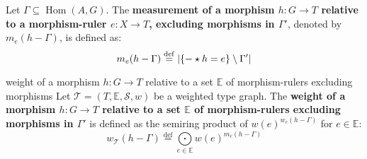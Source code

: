 \begin{definition} 
    \label{def:weight_excluding_pre}
    Let \( \Gamma \subseteq \operatorname{Hom}(A, G) \).
    The \textbf{measurement of a morphism \( h:G \to T \) relative to a morphism-ruler \( e: X \to T \), excluding morphisms in \( \Gamma' \)}, denoted by $m_e(h-\Gamma)$, is defined as:
    \[
        m_e(h-\Gamma) \overset{\operatorname{def}}{=} 
            |\{- \star h = e\} \setminus \Gamma'|
    \]
\end{definition}
\begin{definition}
    \label{def:weight_excluding}
    weight of a morphism $h: G \to T$ relative to a set $\mathbb{E}$ of morphism-rulers excluding morphisms
    Let $\mathcal{T}=(T,\mathbb{E},\mathcal{S},w)$ be a weighted type graph. The \textbf{weight of a morphism $h: G \to T$ relative to a set $\mathbb{E}$ of morphism-rulers excluding morphisms in \( \Gamma' \)} is defined as the semiring product of $w(e)^{w_e(h-\Gamma)}$ for $e \in \mathbb{E}$:
    \[ 
        w_\mathcal{T}(h-\Gamma) \overset{\operatorname{def}}{=} \underset{e \in \mathbb{E}}{\bigodot} 
    w(e)^{m_e(h-\Gamma)}
            \]
\end{definition}

